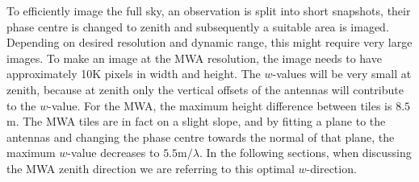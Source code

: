 \documentclass[useAMS,usenatbib]{mn2e}
\begin{document}
To efficiently image the full sky, an observation is split into short snapshots, their phase centre is changed to zenith and subsequently a suitable area is imaged. Depending on desired resolution and dynamic range, this might require very large images. To make an image at the MWA resolution, the image needs to have approximately 10K pixels in width and height. The $w$-values will be very small at zenith, because at zenith only the vertical offsets of the antennas will contribute to the $w$-value. For the MWA, the maximum height difference between tiles is $8.5$m. The MWA tiles are in fact on a slight slope, and by fitting a plane to the antennas and changing the phase centre towards the normal of that plane, the maximum $w$-value decreases to $5.5\textrm{m} / \lambda$. In the following sections, when discussing the MWA zenith direction we are referring to this optimal $w$-direction.
\end{document}
